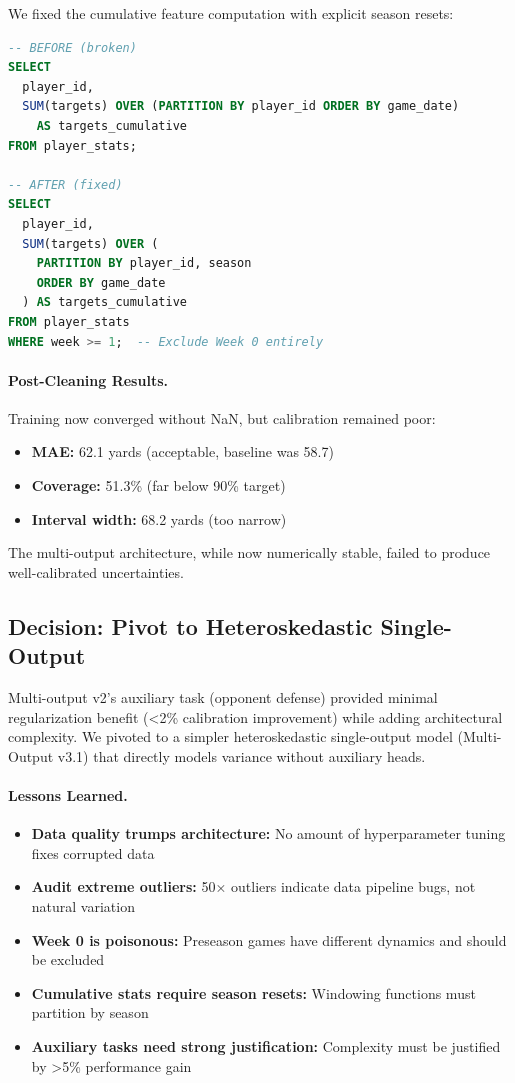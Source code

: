 We fixed the cumulative feature computation with explicit season resets:

\begin{lstlisting}[language=SQL]
-- BEFORE (broken)
SELECT
  player_id,
  SUM(targets) OVER (PARTITION BY player_id ORDER BY game_date)
    AS targets_cumulative
FROM player_stats;

-- AFTER (fixed)
SELECT
  player_id,
  SUM(targets) OVER (
    PARTITION BY player_id, season
    ORDER BY game_date
  ) AS targets_cumulative
FROM player_stats
WHERE week >= 1;  -- Exclude Week 0 entirely
\end{lstlisting}

\paragraph{Post-Cleaning Results.}
Training now converged without NaN, but calibration remained poor:

\begin{itemize}
  \item \textbf{MAE:} 62.1 yards (acceptable, baseline was 58.7)
  \item \textbf{Coverage:} 51.3\% (far below 90\% target)
  \item \textbf{Interval width:} 68.2 yards (too narrow)
\end{itemize}

The multi-output architecture, while now numerically stable, failed to produce well-calibrated uncertainties.

\subsection{Decision: Pivot to Heteroskedastic Single-Output}

Multi-output v2's auxiliary task (opponent defense) provided minimal regularization benefit (<2\% calibration improvement) while adding architectural complexity. We pivoted to a simpler heteroskedastic single-output model (Multi-Output v3.1) that directly models variance without auxiliary heads.

\paragraph{Lessons Learned.}
\begin{itemize}
  \item \textbf{Data quality trumps architecture:} No amount of hyperparameter tuning fixes corrupted data
  \item \textbf{Audit extreme outliers:} 50× outliers indicate data pipeline bugs, not natural variation
  \item \textbf{Week 0 is poisonous:} Preseason games have different dynamics and should be excluded
  \item \textbf{Cumulative stats require season resets:} Windowing functions must partition by season
  \item \textbf{Auxiliary tasks need strong justification:} Complexity must be justified by >5\% performance gain
\end{itemize}

